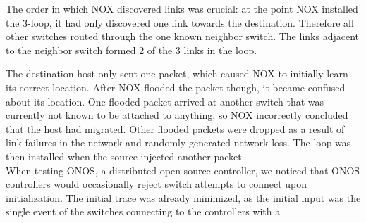 The order in which NOX discovered links was crucial: at the point NOX
installed the 3-loop, it had only discovered one link towards the destination.
Therefore all other switches routed through the one known neighbor switch. The
links adjacent to the neighbor switch formed 2 of the 3 links in the loop.

The destination host only sent one packet, which caused NOX to initially learn
its correct location. After NOX flooded the packet though, it became confused
about its location. One flooded packet arrived at
another switch that was currently not known to be attached to anything, so NOX
incorrectly concluded that the host had migrated. Other flooded packets were
dropped as a result of link failures in the network and randomly generated
network loss. The loop was then installed when the source injected another
packet.\\[0.5ex]
 When testing ONOS, a distributed open-source controller, we noticed
that ONOS controllers would occasionally reject switch attempts to connect upon
initialization. The initial trace was already minimized, as the initial input
was the single event of the switches connecting to the controllers with a
